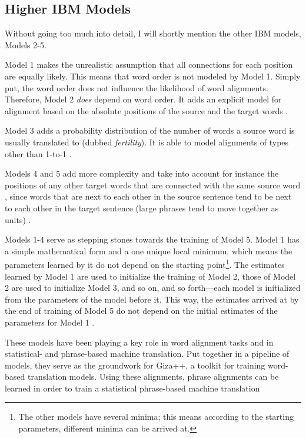 \subsection{Higher IBM Models}
Without going too much into detail, I will shortly mention the other IBM models, Models 2-5. 

Model 1 makes the unrealistic assumption that all connections for each position are equally likely. 
This means that word order is not modeled by Model 1. 
Simply put, the word order does not influence the likelihood of word alignments.
Therefore, Model 2 \emph{does} depend on word order. 
It adds an explicit model for alignment based on the absolute positions of the source and the target words \autocites{brown-etal-1993-mathematics}[99]{koehn2009}.

Model 3 adds a probability distribution of the number of words a source word is usually translated to (dubbed \emph{fertility}). 
It is able to model alignments of types other than 1-to-1 \autocite[100]{koehn2009}. 

Models 4 and 5 add more complexity and take into account for instance the positions of any other target words that are connected with the same source word \autocite{brown-etal-1993-mathematics}, since words that are next to each other in the source sentence tend to be next to each other in the target sentence (large phrases tend to move together as units) \autocite[107]{koehn2009}.

Models 1-4 serve as stepping stones towards the training of Model 5. 
Model 1 has a simple mathematical form and a one unique local minimum, which means the parameters learned by it do not depend on the starting point\footnote{The other models have several minima; this means according to the starting parameters, different minima can be arrived at.}. 
The estimates learned by Model 1 are used to initialize the training of Model 2, those of Model 2 are used to initialize Model 3, and so on, and so forth---each model is initialized from the parameters of the model before it. 
This way, the estimates arrived at by the end of training of Model 5 do not depend  on the initial estimates of the parameters for Model 1 \autocite{brown-etal-1993-mathematics}. 

These models have been playing a key role in word alignment tasks and in statistical- and phrase-based machine translation. 
Put together in a pipeline of models, they serve as the groundwork for Giza++, a toolkit for training word-based translation models. 
Using these alignments, phrase alignments can be learned in order to train a statistical phrase-based machine translation \autocites{och-ney-2000-improved,och-ney-2003-smt}


